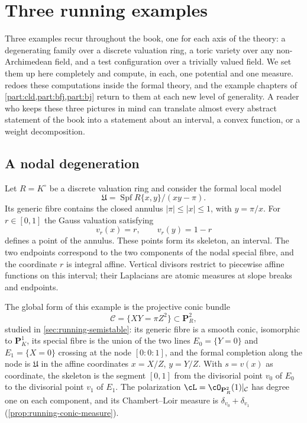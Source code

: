 \section{Three running examples}
\label{sec:ch01-running-examples}

Three examples recur throughout the book, one for each axis of the theory: a
degenerating family over a discrete valuation ring, a toric variety over any
non-Archimedean field, and a test configuration over a trivially valued
field.  We set them up here completely and compute, in each, one potential
and one measure.   redoes these computations
inside the formal theory, and the example chapters of
\cref{part:cld,part:bfj,part:bj} return to them at each new level of
generality.  A reader who keeps these three pictures in mind can translate
almost every abstract statement of the book into a statement about an
interval, a convex function, or a weight decomposition.

\subsection{A nodal degeneration}
\label{sec:ch01-running-nodal}

Let $R=K^\circ$ be a discrete valuation ring and consider the formal local
model
\[
                   \mathfrak U=\operatorname{Spf}
                   R\{x,y\}/(xy-\pi).
\]
Its generic fibre contains the closed annulus
$|\pi|\leq |x|\leq1$, with $y=\pi/x$.  For $r\in[0,1]$ the Gauss valuation
satisfying
\[
                   v_r(x)=r,\qquad v_r(y)=1-r
\]
defines a point of the annulus.  These points form its skeleton, an interval.
The two endpoints correspond to the two components of the nodal special
fibre, and the coordinate $r$ is integral affine.  Vertical divisors restrict
to piecewise affine functions on this interval; their Laplacians are atomic
measures at slope breaks and endpoints.

The global form of this example is the projective conic bundle
\[
             \mathcal C=\{XY=\pi Z^2\}\subset\mathbf P^2_R ,
\]
studied in \cref{sec:running-semistable}: its generic fibre is a smooth
conic, isomorphic to $\mathbf P^1_K$, its special fibre is the union of the
two lines $E_0=\{Y=0\}$ and $E_1=\{X=0\}$ crossing at the node $[0:0:1]$,
and the formal completion along the node is $\mathfrak U$ in the affine
coordinates $x=X/Z$, $y=Y/Z$.  With $s=v(x)$ as coordinate, the skeleton is
the segment $[0,1]$ from the divisorial point $v_0$ of $E_0$ to the
divisorial point $v_1$ of $E_1$.  The polarization
$\cL=\cO_{\mathbf P^2_R}(1)|_{\mathcal C}$ has degree one on each component,
and its Chambert--Loir measure is $\delta_{v_0}+\delta_{v_1}$
(\cref{prop:running-conic-measure}).

